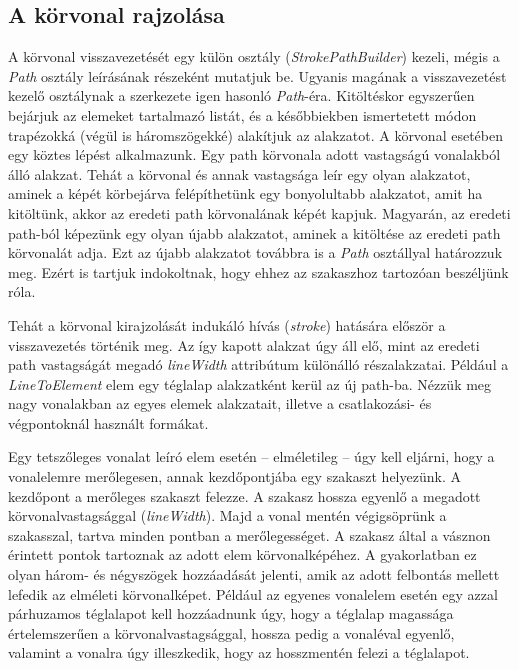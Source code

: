 \documentclass[12pt]{report}
\theoremstyle{definition}
\newcommand{\func}[1]{{\textsl{#1}}}
\begin{document}
    \subsection[A körvonal rajzolása]{A körvonal rajzolása}

A körvonal visszavezetését egy külön osztály (\func{StrokePathBuilder}) kezeli,
mégis a \func{Path} osztály leírásának részeként mutatjuk be. Ugyanis magának a
visszavezetést kezelő osztálynak a szerkezete igen hasonló \func{Path}-éra.
Kitöltéskor egyszerűen bejárjuk az elemeket tartalmazó listát, és a
későbbiekben ismertetett módon trapézokká (végül is háromszögekké) alakítjuk az
alakzatot. A körvonal esetében egy köztes lépést alkalmazunk. Egy path
körvonala adott vastagságú vonalakból álló alakzat. Tehát a körvonal és annak
vastagsága leír egy olyan alakzatot, aminek a képét körbejárva felépíthetünk
egy bonyolultabb alakzatot, amit ha kitöltünk, akkor az eredeti path körvonalának
képét kapjuk. Magyarán, az eredeti path-ból képezünk egy olyan újabb alakzatot,
aminek a kitöltése az eredeti path körvonalát adja. Ezt az újabb alakzatot
továbbra is a \func{Path} osztállyal határozzuk meg. Ezért is tartjuk
indokoltnak, hogy ehhez az szakaszhoz tartozóan beszéljünk róla.

Tehát a körvonal kirajzolását indukáló hívás (\emph{stroke}) hatására először a
visszavezetés történik meg. Az így kapott alakzat úgy áll elő, mint az eredeti
path vastagságát megadó \func{lineWidth} attribútum különálló részalakzatai.
Például a \func{LineToElement} elem egy téglalap alakzatként kerül az új
path-ba. Nézzük meg nagy vonalakban az egyes elemek alakzatait, illetve a
csatlakozási- és végpontoknál használt formákat.

Egy tetszőleges vonalat leíró elem esetén -- elméletileg -- úgy kell eljárni,
hogy a vonalelemre merőlegesen, annak kezdőpontjába egy szakaszt helyezünk. A
kezdőpont a merőleges szakaszt felezze. A szakasz hossza egyenlő a megadott
körvonalvastagsággal (\func{lineWidth}). Majd a vonal mentén végigsöprünk a
szakasszal, tartva minden pontban a merőlegességet. A szakasz által a vásznon
érintett pontok tartoznak az adott elem körvonalképéhez. A gyakorlatban ez
olyan három- és négyszögek hozzáadását jelenti, amik az adott felbontás mellett
lefedik az elméleti körvonalképet. Például az egyenes vonalelem esetén egy
azzal párhuzamos téglalapot kell hozzáadnunk úgy, hogy a téglalap magassága
értelemszerűen a körvonalvastagsággal, hossza pedig a vonaléval egyenlő,
valamint a vonalra úgy illeszkedik, hogy az hosszmentén felezi a téglalapot.
\end{document}
